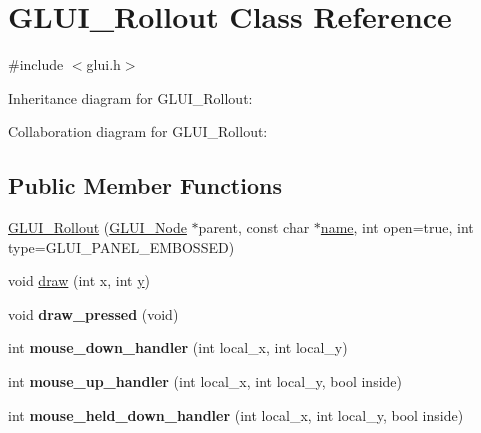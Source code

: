\hypertarget{class_g_l_u_i___rollout}{\section{G\+L\+U\+I\+\_\+\+Rollout Class Reference}
\label{class_g_l_u_i___rollout}
}


{\ttfamily \#include $<$glui.\+h$>$}



Inheritance diagram for G\+L\+U\+I\+\_\+\+Rollout\+:


Collaboration diagram for G\+L\+U\+I\+\_\+\+Rollout\+:
\subsection*{Public Member Functions}
\begin{DoxyCompactItemize}
\item 
\hyperlink{class_g_l_u_i___rollout_a24c6af54874ab79245debf924048bee2}{G\+L\+U\+I\+\_\+\+Rollout} (\hyperlink{class_g_l_u_i___node}{G\+L\+U\+I\+\_\+\+Node} $\ast$parent, const char $\ast$\hyperlink{class_g_l_u_i___control_aa95b97d50df45335fc33f0af03958eb3}{name}, int open=true, int type=G\+L\+U\+I\+\_\+\+P\+A\+N\+E\+L\+\_\+\+E\+M\+B\+O\+S\+S\+E\+D)
\item 
void \hyperlink{class_g_l_u_i___rollout_ae3ff0bbeb04f22aa5489cf542b6e3fbb}{draw} (int x, int \hyperlink{_ice_utils_8h_aa7ffaed69623192258fb8679569ff9ba}{y})
\item 
\hypertarget{class_g_l_u_i___rollout_aa3fbc3548f10ee8209d2eb0b46c05b6d}{void {\bfseries draw\+\_\+pressed} (void)}\label{class_g_l_u_i___rollout_aa3fbc3548f10ee8209d2eb0b46c05b6d}

\item 
\hypertarget{class_g_l_u_i___rollout_abbd554515b6f0136f6aa89d260b826e5}{int {\bfseries mouse\+\_\+down\+\_\+handler} (int local\+\_\+x, int local\+\_\+y)}\label{class_g_l_u_i___rollout_abbd554515b6f0136f6aa89d260b826e5}

\item 
\hypertarget{class_g_l_u_i___rollout_ac7df2e007640c4a21deb494c8eb8ca03}{int {\bfseries mouse\+\_\+up\+\_\+handler} (int local\+\_\+x, int local\+\_\+y, bool inside)}\label{class_g_l_u_i___rollout_ac7df2e007640c4a21deb494c8eb8ca03}

\item 
\hypertarget{class_g_l_u_i___rollout_a55eb4c45f7857bbae04e857aadf2b505}{int {\bfseries mouse\+\_\+held\+\_\+down\+\_\+handler} (int local\+\_\+x, int local\+\_\+y, bool inside)}\label{class_g_l_u_i___rollout_a55eb4c45f7857bbae04e857aadf2b505}


\end{DoxyCompactItemize}
